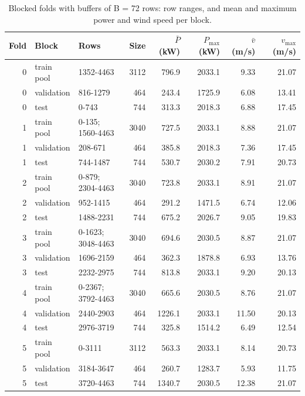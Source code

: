 \begin{table}[htbp]
\centering
\small
\caption{Blocked folds with buffers of B = 72 rows: row ranges, and mean and maximum power and wind speed per block.}
\label{tab:t1b}
\begin{tabular}{rllrrrrr}
\toprule
Fold & Block & Rows & Size & $\bar P$ (kW) & $P_{\max}$ (kW) & $\bar v$ (m/s) & $v_{\max}$ (m/s) \\
\midrule
0 & train pool & 1352-4463 & 3112 & 796.9 & 2033.1 & 9.33 & 21.07 \\
0 & validation & 816-1279 & 464 & 243.4 & 1725.9 & 6.08 & 13.41 \\
0 & test & 0-743 & 744 & 313.3 & 2018.3 & 6.88 & 17.45 \\
\midrule
1 & train pool & 0-135; 1560-4463 & 3040 & 727.5 & 2033.1 & 8.88 & 21.07 \\
1 & validation & 208-671 & 464 & 385.8 & 2018.3 & 7.36 & 17.45 \\
1 & test & 744-1487 & 744 & 530.7 & 2030.2 & 7.91 & 20.73 \\
\midrule
2 & train pool & 0-879; 2304-4463 & 3040 & 723.8 & 2033.1 & 8.91 & 21.07 \\
2 & validation & 952-1415 & 464 & 291.2 & 1471.5 & 6.74 & 12.06 \\
2 & test & 1488-2231 & 744 & 675.2 & 2026.7 & 9.05 & 19.83 \\
\midrule
3 & train pool & 0-1623; 3048-4463 & 3040 & 694.6 & 2030.5 & 8.87 & 21.07 \\
3 & validation & 1696-2159 & 464 & 362.3 & 1878.8 & 6.93 & 13.76 \\
3 & test & 2232-2975 & 744 & 813.8 & 2033.1 & 9.20 & 20.13 \\
\midrule
4 & train pool & 0-2367; 3792-4463 & 3040 & 665.6 & 2030.5 & 8.76 & 21.07 \\
4 & validation & 2440-2903 & 464 & 1226.1 & 2033.1 & 11.50 & 20.13 \\
4 & test & 2976-3719 & 744 & 325.8 & 1514.2 & 6.49 & 12.54 \\
\midrule
5 & train pool & 0-3111 & 3112 & 563.3 & 2033.1 & 8.14 & 20.73 \\
5 & validation & 3184-3647 & 464 & 260.7 & 1283.7 & 5.93 & 11.75 \\
5 & test & 3720-4463 & 744 & 1340.7 & 2030.5 & 12.38 & 21.07 \\
\bottomrule
\end{tabular}
\end{table}

